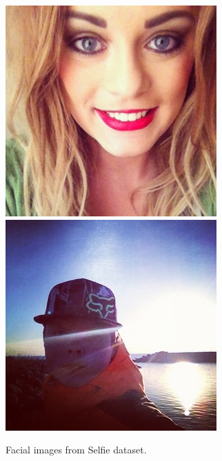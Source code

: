 \begin{figure}[h]
\centering
    \subfloat
        {\includegraphics[scale = 0.3]{figures/10249165_693227110715964_1497214365_a.jpg}\hspace{0.42cm}}
    \subfloat
        {\includegraphics[scale = 0.3]{figures/10251439_436588196485138_396348425_a.jpg}\hspace{0.42cm}}
    \caption{Facial images from Selfie dataset.}
    \label{fig:selfie_dataset}
\end{figure}


